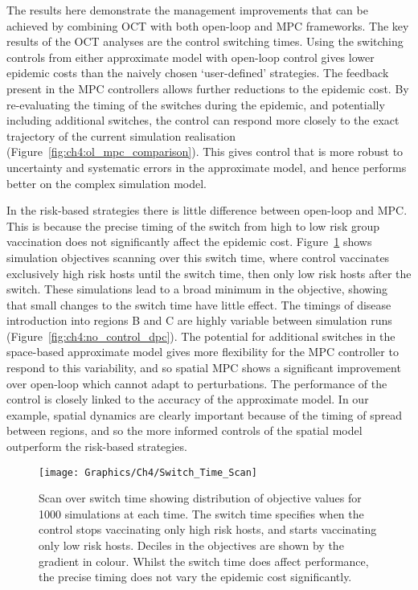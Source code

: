 The results here demonstrate the management improvements that can be achieved by combining OCT with both open-loop and MPC frameworks. The key results of the OCT analyses are the control switching times. Using the switching controls from either approximate model with open-loop control gives lower epidemic costs than the naively chosen `user-defined' strategies. The feedback present in the MPC controllers allows further reductions to the epidemic cost. By re-evaluating the timing of the switches during the epidemic, and potentially including additional switches, the control can respond more closely to the exact trajectory of the current simulation realisation (Figure~\ref{fig:ch4:ol_mpc_comparison}). This gives control that is more robust to uncertainty and systematic errors in the approximate model, and hence performs better on the complex simulation model.

In the risk-based strategies there is little difference between open-loop and MPC\@. This is because the precise timing of the switch from high to low risk group vaccination does not significantly affect the epidemic cost. Figure~\ref{fig:ch4:switch_time_scan} shows simulation objectives scanning over this switch time, where control vaccinates exclusively high risk hosts until the switch time, then only low risk hosts after the switch. These simulations lead to a broad minimum in the objective, showing that small changes to the switch time have little effect. The timings of disease introduction into regions B and C are highly variable between simulation runs (Figure~\ref{fig:ch4:no_control_dpc}). The potential for additional switches in the space-based approximate model gives more flexibility for the MPC controller to respond to this variability, and so spatial MPC shows a significant improvement over open-loop which cannot adapt to perturbations. The performance of the control is closely linked to the accuracy of the approximate model. In our example, spatial dynamics are clearly important because of the timing of spread between regions, and so the more informed controls of the spatial model outperform the risk-based strategies.

\begin{figure}[h]
    \begin{center}
        \texttt{[image: Graphics/Ch4/Switch\_Time\_Scan]}
        \caption[Effect of switch time on strategy performance]{Scan over switch time showing distribution of objective values for 1000 simulations at each time. The switch time specifies when the control stops vaccinating only high risk hosts, and starts vaccinating only low risk hosts. Deciles in the objectives are shown by the gradient in colour. Whilst the switch time does affect performance, the precise timing does not vary the epidemic cost significantly.}
        \label{fig:ch4:switch_time_scan}
    \end{center}
\end{figure}

